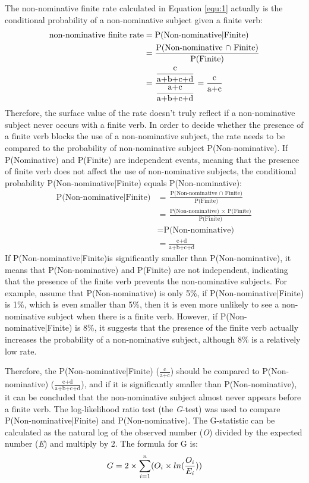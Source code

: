 The non-nominative finite rate calculated in Equation \ref{equ:1}  actually is the conditional probability of a  non-nominative subject given a finite verb: 
\begin{align*}
\label{equ:44}
\centering
\text{non-nominative finite rate} & = \text{P(Non-nominative|Finite)}\\
&= \displaystyle\frac{\text{P(Non-nominative $\cap$ Finite)}}{\text{P(Finite)}}\\
& = \displaystyle\frac{\displaystyle\frac{\text{c}}{\text{a+b+c+d}}}{\displaystyle\frac{\text{a+c}}{\text{a+b+c+d}}} = \displaystyle\frac{\text{c}}{\text{a+c}}
\end{align*}
Therefore, the surface value of the rate doesn't truly reflect if a non-nominative subject never occurs with a finite verb. In order to decide whether the presence of a finite verb blocks the use of a non-nominative subject, the rate needs to be compared to the probability of non-nominative subject P(Non-nominative). If P(Nominative) and P(Finite) are independent events, meaning that the presence of finite verb does not affect the use of non-nominative subjects, the conditional probability P(Non-nominative|Finite) equals P(Non-nominative): 
\begin{align*}
   \text{P(Non-nominative|Finite)} &= 
   \displaystyle\frac{\text{P(Non-nominative $\cap$ Finite)}}{\text{P(Finite)}}\\
   &= \displaystyle\frac{\text{P(Non-nominative) $\times$ P(Finite)}}{\text{P(Finite)}}\\
   &= \text{P(Non-nominative)}\\
   &= \displaystyle\frac{\text{c+d}}{\text{a+b+c+d}}
\end{align*}
If P(Non-nominative|Finite)is significantly smaller than P(Non-nominative), it means that P(Non-nominative) and P(Finite) are not independent, indicating that the presence of the finite verb prevents the non-nominative subjects. For example, assume that P(Non-nominative) is only 5\%, if  P(Non-nominative|Finite) is 1\%, which is even smaller than 5\%, then it is even more unlikely to see a non-nominative subject when there is a finite verb. However, if P(Non-nominative|Finite) is 8\%, it suggests that the presence of the finite verb actually increases the probability of a non-nominative subject, although 8\% is a relatively low rate.  

Therefore, the P(Non-nominative|Finite) ($\displaystyle\frac{\text{c}}{\text{a+c}}$) should be compared to P(Non-nominative) ($\displaystyle\frac{\text{c+d}}{\text{a+b+c+d}}$), and if it is significantly smaller than P(Non-nominative), it can be concluded that the non-nominative subject almost never appears before a finite verb. The log-likelihood ratio test (the \textit{G}-test) was used to compare P(Non-nominative|Finite) and P(Non-nominative). The G-statistic can be calculated as the natural log of the observed number (\textit{O}) divided by the expected number (\textit{E}) and multiply by 2. The formula for G is:
\begin{equation}
    \centering
    G = 2 \times \displaystyle\sum_{i = 1}^{n}(O_i \times ln(\displaystyle\frac{\text{$O_i$}}{\text{$E_i$}}))
\end{equation}


